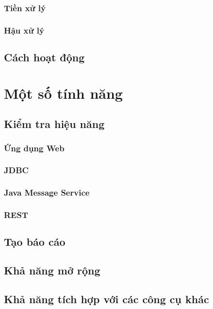 \documentclass[10pt]{report}
\begin{document}
\subsection{Tiền xử lý}
\subsection{Hậu xử lý}

\section{Cách hoạt động}

\chapter{Một số tính năng}

\section{Kiểm tra hiệu năng}

\subsection{Ứng dụng Web}

\subsection{JDBC}

\subsection{Java Message Service}

\subsection{REST}

\section{Tạo báo cáo}

\section{Khả năng mở rộng}

\section{Khả năng tích hợp với các công cụ khác}
\end{document}
